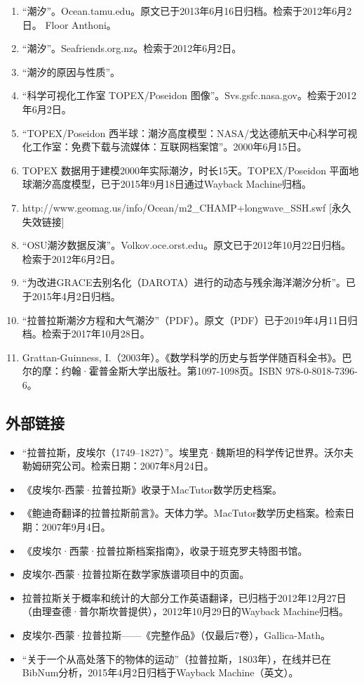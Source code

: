 \begin{enumerate}
\item “潮汐”。Ocean.tamu.edu。原文已于2013年6月16日归档。检索于2012年6月2日。  
Floor Anthoni。
\item “潮汐”。Seafriends.org.nz。检索于2012年6月2日。  
\item “潮汐的原因与性质”。
\item “科学可视化工作室 TOPEX/Poseidon 图像”。Svs.gsfc.nasa.gov。检索于2012年6月2日。  
\item “TOPEX/Poseidon 西半球：潮汐高度模型：NASA/戈达德航天中心科学可视化工作室：免费下载与流媒体：互联网档案馆”。2000年6月15日。  
\item TOPEX 数据用于建模2000年实际潮汐，时长15天。TOPEX/Poseidon 平面地球潮汐高度模型，已于2015年9月18日通过Wayback Machine归档。  
\item http://www.geomag.us/info/Ocean/m2_CHAMP+longwave_SSH.swf [永久失效链接]  
\item “OSU潮汐数据反演”。Volkov.oce.orst.edu。原文已于2012年10月22日归档。检索于2012年6月2日。  
\item “为改进GRACE去别名化（DAROTA）进行的动态与残余海洋潮汐分析”。已于2015年4月2日归档。  
\item “拉普拉斯潮汐方程和大气潮汐”（PDF）。原文（PDF）已于2019年4月11日归档。检索于2017年10月28日。  
\item Grattan-Guinness, I.（2003年）。《数学科学的历史与哲学伴随百科全书》。巴尔的摩：约翰·霍普金斯大学出版社。第1097-1098页。ISBN 978-0-8018-7396-6。
\end{enumerate}

\subsection{外部链接}
\begin{itemize}
\item “拉普拉斯，皮埃尔（1749–1827）”。埃里克·魏斯坦的科学传记世界。沃尔夫勒姆研究公司。检索日期：2007年8月24日。  
\item 《皮埃尔-西蒙·拉普拉斯》收录于MacTutor数学历史档案。  
\item 《鲍迪奇翻译的拉普拉斯前言》。天体力学。MacTutor数学历史档案。检索日期：2007年9月4日。  
\item 《皮埃尔·西蒙·拉普拉斯档案指南》，收录于班克罗夫特图书馆。  
\item 皮埃尔-西蒙·拉普拉斯在数学家族谱项目中的页面。  
\item 拉普拉斯关于概率和统计的大部分工作英语翻译，已归档于2012年12月27日（由理查德·普尔斯坎普提供），2012年10月29日的Wayback Machine归档。  
\item 皮埃尔-西蒙·拉普拉斯——《完整作品》（仅最后7卷），Gallica-Math。  
\item “关于一个从高处落下的物体的运动”（拉普拉斯，1803年），在线并已在BibNum分析，2015年4月2日归档于Wayback Machine（英文）。
\end{itemize}